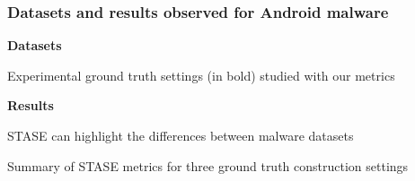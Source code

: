 \begin{frame}
    \frametitle{Datasets and results observed for Android malware}
    \centering

    \begin{block}{}
        \centering
        \textbf{Datasets}
    \end{block}
    \vspace{-11pt}
    \begin{table}[!ht]
        \resizebox{\textwidth}{!}{
            
        }
        \caption{\footnotesize{Experimental ground truth settings (in bold) studied with our metrics}}
    \end{table}

    \vspace{-10pt}

    \begin{block}{}
        \centering
        \textbf{Results}
    \end{block}

    STASE can highlight the differences between malware datasets

    \begin{table}[!ht]
        \resizebox{\textwidth}{!}{
            
        }
        \caption{\footnotesize{Summary of STASE metrics for three ground truth construction settings}}
    \end{table}





\end{frame}
